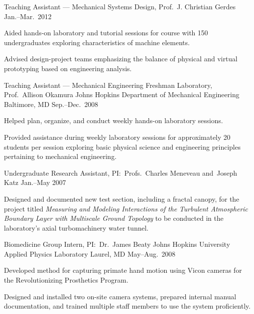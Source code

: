 \begin{cventries}
  \cventry%
    {Teaching Assistant --- Mechanical Systems Design, Prof.~J. Christian Gerdes}
    {}
    {}
    {Jan.--Mar.\ 2012}
    {
      \begin{cvitems}
        \item{Aided hands-on laboratory and tutorial sessions for course with 150 undergraduates exploring characteristics of machine elements.}
        \item{Advised design-project teams emphasizing the balance of physical and virtual prototyping based on engineering analysis.}
      \end{cvitems}
    }

  \cventry%
    {Teaching Assistant --- Mechanical Engineering Freshman Laboratory, Prof.~Allison Okamura}
    {Johns Hopkins Department of Mechanical Engineering}
    {Baltimore, MD}
    {Sep.--Dec.\ 2008}
    {
      \begin{cvitems}
        \item{Helped plan, organize, and conduct weekly hands-on laboratory sessions.}
        \item{Provided assistance during weekly laboratory sessions for approximately 20 students per session exploring basic physical science and engineering principles pertaining to mechanical engineering.}
      \end{cvitems}
    }

 \cventry%
   {Undergraduate Research Assistant, PI:\ Profs.~Charles Meneveau and~Joseph Katz}
   {}
   {}
   {Jan.--May 2007}
   {
     \begin{cvitems}
       \item{Designed and documented new test section, including a fractal canopy, for the project titled \textit{Measuring and Modeling Interactions of the Turbulent Atmospheric Boundary Layer with Multiscale Ground Topology} to be conducted in the laboratory's axial turbomachinery water tunnel.}
     \end{cvitems}
   }

  \cventry%
    {Biomedicine Group Intern, PI:\ Dr.~James Beaty}
    {Johns Hopkins University Applied Physics Laboratory}
    {Laurel, MD}
    {May--Aug.\ 2008}
    {
      \begin{cvitems}
        \item{Developed method for capturing primate hand motion using Vicon cameras for the Revolutionizing Prosthetics Program.}
        \item{Designed and installed two on-site camera systems, prepared internal manual documentation, and trained multiple staff members to use the system proficiently.}
      \end{cvitems}
    }


\end{cventries}
